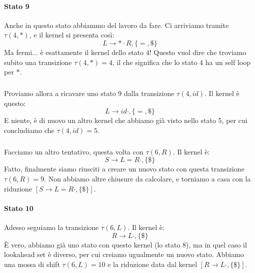 \documentclass[class=book, crop=false, oneside, 12pt]{standalone}
\begin{document}
\paragraph{Stato 9}
Anche in questo stato abbiammo del lavoro da fare. Ci arriviamo tramite \(\tau(4, \ast)\), e il kernel si presenta così:
\begin{equation*}
    L \to \ast \cdot R, \{=, \$\}
\end{equation*}
Ma fermi... è esattamente il kernel dello stato 4! Questo vuol dire che troviamo subito una transizione \(\tau(4, \ast) = 4\), il che significa che lo stato 4 ha un self loop per \(\ast\).

\subparagraph*{}
Proviamo allora a ricavare uno stato 9 dalla transizione \(\tau(4, id)\). Il kernel è questo:
\begin{equation*}
    L \to id \cdot, \{=, \$\}
\end{equation*}
E niente, è di nuovo un altro kernel che abbiamo già visto nello stato 5, per cui concludiamo che \(\tau(4, id) = 5\).

\subparagraph*{}
Facciamo un altro tentativo, questa volta con \(\tau(6, R)\). Il kernel è:
\begin{equation*}
    S \to L = R \cdot, \{\$\}
\end{equation*}
Fatto, finalmente siamo riusciti a creare un nuovo stato con questa transizione \(\tau(6, R) = 9\). Non abbiamo altre chiusure da calcolare, e torniamo a casa con la riduzione \([S \to L = R \cdot, \{\$\}]\).

\paragraph{Stato 10}
Adesso seguiamo la transizione \(\tau(6, L)\). Il kernel è:
\begin{equation*}
    R \to L \cdot, \{\$\}
\end{equation*}
È vero, abbiamo già uno stato con questo kernel (lo stato 8), ma in quel caso il lookahead set è diverso, per cui creiamo ugualmente un nuovo stato. Abbiamo una mossa di shift \(\tau(6, L) = 10\) e la riduzione data dal kernel \([R \to L \cdot, \{\$\}]\).
\end{document}
